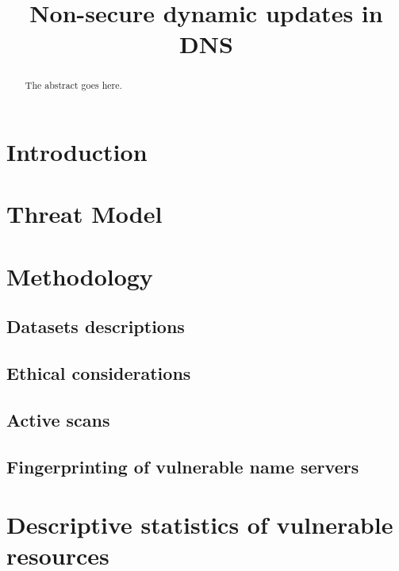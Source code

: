 \documentclass[conference]{IEEEtran}
\begin{document}
\title{Non-secure dynamic updates in DNS}

\author{
\and
{}
\and
{}
}

\maketitle



\begin{abstract}
The abstract goes here.
\end{abstract}

\section{Introduction}





\section{Threat Model}
\section{Methodology}
\subsection{Datasets descriptions}
\subsection{Ethical considerations}
\subsection{Active scans}



\subsection{Fingerprinting of vulnerable name servers}
\section{Descriptive statistics of vulnerable resources}
\end{document}
